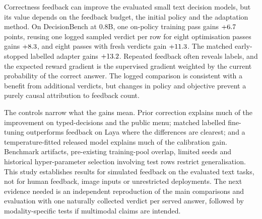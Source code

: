 Correctness feedback can improve the evaluated small text decision models, but its value depends on the feedback budget, the initial policy and the adaptation method. On DecisionBench at 0.8B, one on-policy training pass gains $+6.7$ points, reusing one logged sampled verdict per row for eight optimisation passes gains $+8.3$, and eight passes with fresh verdicts gain $+11.3$. The matched early-stopped labelled adapter gains $+13.2$. Repeated feedback often reveals labels, and the expected reward gradient is the supervised gradient weighted by the current probability of the correct answer. The logged comparison is consistent with a benefit from additional verdicts, but changes in policy and objective prevent a purely causal attribution to feedback count.

The controls narrow what the gains mean. Prior correction explains much of the improvement on typed-decisions and the public menu; matched labelled fine-tuning outperforms feedback on Laya where the differences are clearest; and a temperature-fitted released model explains much of the calibration gain. Benchmark artifacts, pre-existing training-pool overlap, limited seeds and historical hyper-parameter selection involving test rows restrict generalisation. This study establishes results for simulated feedback on the evaluated text tasks, not for human feedback, image inputs or unrestricted deployments. The next evidence needed is an independent reproduction of the main comparisons and evaluation with one naturally collected verdict per served answer, followed by modality-specific tests if multimodal claims are intended.
